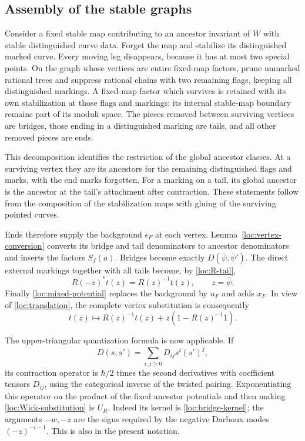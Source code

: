 \subsection{Assembly of the stable graphs}

Consider a fixed stable map contributing to an ancestor invariant of
$W$ with stable distinguished curve data. Forget the map and
stabilize its distinguished marked curve. Every moving leg disappears,
because it has at most two special points. On the graph whose vertices
are entire fixed-map factors, prune unmarked rational trees and
suppress rational chains with two remaining flags, keeping all
distinguished markings. A fixed-map factor which survives is retained
with its own stabilization at those flags and markings; its internal
stable-map boundary remains part of its moduli space. The pieces
removed between surviving vertices are bridges, those ending in a
distinguished marking are tails, and all other removed pieces are
ends.

This decomposition identifies the restriction of the global ancestor
classes. At a surviving vertex they are its ancestors for the
remaining distinguished flags and marks, with the end marks forgotten.
For a marking on a tail, its global ancestor is the ancestor at the
tail's attachment after contraction. These statements follow from
the composition of the stabilization maps with gluing of the
surviving pointed curves.

Ends therefore supply the background $\epsilon_F$ at each vertex.
Lemma~\ref{loc:vertex-conversion} converts its bridge and tail
denominators to ancestor denominators and inserts the factors
$S_f(a)$. Bridges become exactly
$D(\bar\psi,\bar\psi')$. The direct external markings together
with all tails become, by \eqref{loc:R-tail},
\[
                   R(-z)^*t(z)=R(z)^{-1}t(z),
                   \qquad z=\bar\psi.
\]
Finally \eqref{loc:mixed-potential} replaces the background by $u_F$
and adds $x_F$. In view of \eqref{loc:translation}, the complete
vertex substitution is consequently
\begin{equation}\label{loc:Wick-substitution}
                t(z)\longmapsto
                  R(z)^{-1}t(z)+z(1-R(z)^{-1}1).
\end{equation}

The upper-triangular quantization formula
\cite[Proposition~7.3]{GiventalQuant} is now applicable. If
\[
                   D(s,s')=\sum_{i,j\geq0}D_{ij}s^i(s')^j,
\]
its contraction operator is $\hbar/2$ times the second derivatives
with coefficient tensors $D_{ij}$, using the categorical inverse of
the twisted pairing. Exponentiating this operator on the product
of the fixed ancestor potentials and then making
\eqref{loc:Wick-substitution} is $U_R$. Indeed its kernel is
\eqref{loc:bridge-kernel}; the arguments $-w,-z$ are the signs
required by the negative Darboux modes $(-z)^{-i-1}$.
This is also \cite[Equation~(19)]{CGT} in the present notation.

